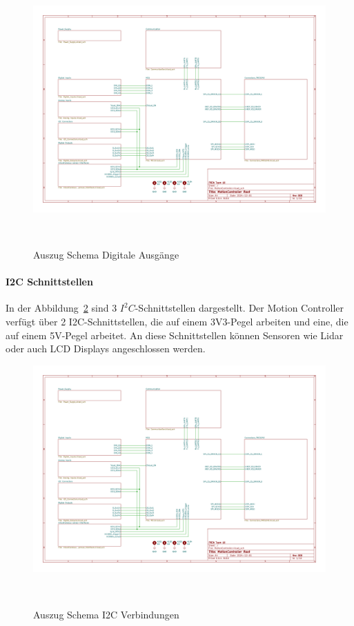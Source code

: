 \documentclass[main.  tex]{subfiles} %
\begin{document}
\begin{figure}[h!]
    \centering
    \includegraphics[page=8,width=\textwidth]{../Anhang_pdfs/MotionController.pdf}
    \caption{Auszug Schema Digitale Ausgänge}~\label{fig:Schema_DOut}
\end{figure}

\paragraph{I2C Schnittstellen}
In der Abbildung~\ref{fig:Schema_I2C} sind 3 $I^2C$-Schnittstellen dargestellt.
Der Motion Controller verfügt über 2 I2C-Schnittstellen, die auf einem
3V3-Pegel arbeiten und eine, die auf einem 5V-Pegel arbeitet. An diese
Schnittstellen können Sensoren wie Lidar oder auch LCD Displays angeschlossen
werden.

\begin{figure}[h!]
    \centering
    \includegraphics[page=9,width=\textwidth]{../Anhang_pdfs/MotionController.pdf}
    \caption{Auszug Schema I2C Verbindungen}~\label{fig:Schema_I2C}
\end{figure}
\end{document}
